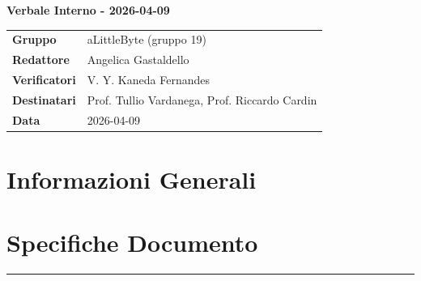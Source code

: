 \documentclass[a4paper,12pt]{article}
\begin{document}
\thispagestyle{firstpage}

\vspace*{0.5cm}

\begin{center}
    {\LARGE \textbf{Verbale Interno - 2026-04-09}}
\end{center}

\vspace{1.5cm}

\begin{center}
    \renewcommand{\arraystretch}{1.3}
    \begin{tcolorbox}[
        width=0.92\textwidth,
        colback=gray!6,
        colframe=gray!45,
        boxrule=0.5pt,
        arc=2mm,
        boxsep=0pt,
        left=8pt, right=8pt, top=8pt, bottom=8pt
    ]
        \begin{tabularx}{\linewidth}{>{\bfseries}p{3.5cm} X}
            Gruppo      & aLittleByte (gruppo 19) \\
            Redattore   & Angelica Gastaldello \\
            Verificatori & V. Y. Kaneda Fernandes\\
            Destinatari & Prof. Tullio Vardanega, Prof. Riccardo Cardin \\
            Data        & 2026-04-09\\
        \end{tabularx}
    \end{tcolorbox}
\end{center}

\newpage

\tableofcontents
\newpage
\section{Informazioni Generali}
\section*{Specifiche Documento}
\hrule
\vspace{1cm}
\end{document}
